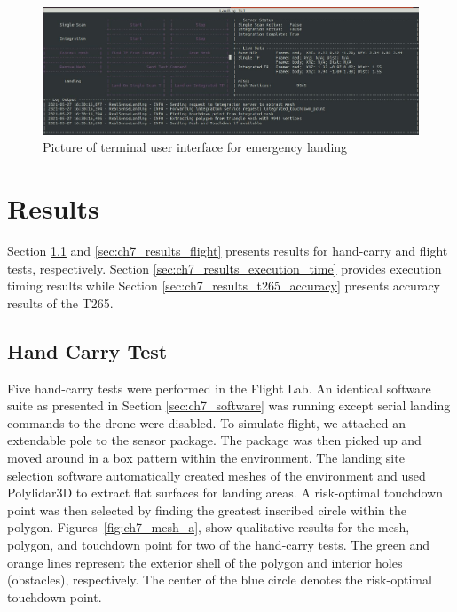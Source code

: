 \begin{figure}[!tb]
    \centering  
    \includegraphics[page=1,clip,trim=0cm 0cm 0cm 0cm,width=.95\linewidth]{chapter_7_experiments/imgs/SensorPackage_TUI.pdf}
    \caption[Picture of terminal user interface for emergency landing]{Picture of terminal user interface for emergency landing}\label{fig:ch7_tui}
\end{figure}

\section{Results}

Section \ref{sec:ch7_results_handcarry} and \ref{sec:ch7_results_flight} presents results for hand-carry and flight tests, respectively. Section \ref{sec:ch7_results_execution_time} provides execution timing results while Section \ref{sec:ch7_results_t265_accuracy} presents accuracy results of the T265.

\subsection{Hand Carry Test} \label{sec:ch7_results_handcarry}

Five hand-carry tests were performed in the Flight Lab. An identical software suite as presented in Section \ref{sec:ch7_software} was running except serial landing commands to the drone were disabled. To simulate flight, we attached an extendable pole to the sensor package.  The package was then picked up and moved around in a box pattern within the environment. The landing site selection software automatically created meshes of the environment and used Polylidar3D to extract flat surfaces for landing areas.  A risk-optimal touchdown point was then selected by finding the greatest inscribed circle within the polygon. Figures~\ref{fig:ch7_mesh_a}, show qualitative results for the mesh, polygon, and touchdown point for two of the hand-carry tests. The green and orange lines represent the exterior shell of the polygon and interior holes (obstacles), respectively. The center of the blue circle denotes the risk-optimal touchdown point. 

